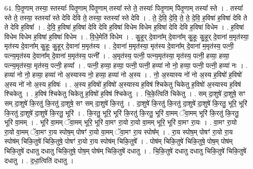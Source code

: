 \documentclass[17pt]{extarticle}
\begin{document}
64. पि॒तृ॒णाम् तस्या॒ स्तस्याः᳚ पितृ॒णाम् पि॑तृ॒णाम् तस्या᳚ स्ते ते॒ तस्याः᳚ पितृ॒णाम् पि॑तृ॒णाम् तस्या᳚ स्ते । . तस्या᳚ स्ते ते॒ तस्या॒ स्तस्या᳚ स्ते देवि देवि ते॒ तस्या॒ स्तस्या᳚ स्ते देवि । . ते॒ दे॒वि॒ दे॒वि॒ ते॒ ते॒ दे॒वि॒ ह॒विषा॑ ह॒विषा॑ देवि ते ते देवि ह॒विषा᳚ । . दे॒वि॒ ह॒विषा॑ ह॒विषा॑ देवि देवि ह॒विषा॑ विधेम विधेम ह॒विषा॑ देवि देवि ह॒विषा॑ विधेम । . ह॒विषा॑ विधेम विधेम ह॒विषा॑ ह॒विषा॑ विधेम । . वि॒धे॒मेति॑ विधेम । . कु॒हूर् दे॒वाना᳚म् दे॒वाना᳚म् कु॒हूः कु॒हूर् दे॒वाना॑ म॒मृत॑स्या॒ मृत॑स्य दे॒वाना᳚म् कु॒हूः कु॒हूर् दे॒वाना॑ म॒मृत॑स्य । . दे॒वाना॑ म॒मृत॑स्या॒ मृत॑स्य दे॒वाना᳚म् दे॒वाना॑ म॒मृत॑स्य॒ पत्नी॒ पत्न्य॒मृत॑स्य दे॒वाना᳚म् दे॒वाना॑ म॒मृत॑स्य॒ पत्नी᳚ । . अ॒मृत॑स्य॒ पत्नी॒ पत्न्य॒मृत॑स्या॒ मृत॑स्य॒ पत्नी॒ हव्या॒ हव्या॒ पत्न्य॒मृत॑स्या॒ मृत॑स्य॒ पत्नी॒ हव्या᳚ । . पत्नी॒ हव्या॒ हव्या॒ पत्नी॒ पत्नी॒ हव्या॑ नो नो॒ हव्या॒ पत्नी॒ पत्नी॒ हव्या॑ नः । . हव्या॑ नो नो॒ हव्या॒ हव्या॑ नो अ॒स्यास्य नो॒ हव्या॒ हव्या॑ नो अ॒स्य । . नो॒ अ॒स्यास्य नो॑ नो अ॒स्य ह॒विषो॑ ह॒विषो॑ अ॒स्य नो॑ नो अ॒स्य ह॒विषः॑ । . अ॒स्य ह॒विषो॑ ह॒विषो॑ अ॒स्यास्य ह॒विष॑ श्चिकेतु चिकेतु ह॒विषो॑ अ॒स्यास्य ह॒विष॑ श्चिकेतु । . ह॒विष॑ श्चिकेतु चिकेतु ह॒विषो॑ ह॒विष॑ श्चिकेतु । . चि॒के॒त्विति॑ चिकेतु । . सम् दा॒शुषे॑ दा॒शुषे॒ सꣳ सम् दा॒शुषे॑ कि॒रतु॑ कि॒रतु॑ दा॒शुषे॒ सꣳ सम् दा॒शुषे॑ कि॒रतु॑ । . दा॒शुषे॑ कि॒रतु॑ कि॒रतु॑ दा॒शुषे॑ दा॒शुषे॑ कि॒रतु॒ भूरि॒ भूरि॑ कि॒रतु॑ दा॒शुषे॑ दा॒शुषे॑ कि॒रतु॒ भूरि॑ । . कि॒रतु॒ भूरि॒ भूरि॑ कि॒रतु॑ कि॒रतु॒ भूरि॑ वा॒मम् ॅवा॒मम् भूरि॑ कि॒रतु॑ कि॒रतु॒ भूरि॑ वा॒मम् । . भूरि॑ वा॒मम् ॅवा॒मम् भूरि॒ भूरि॑ वा॒मꣳ रा॒यो रा॒यो वा॒मम् भूरि॒ भूरि॑ वा॒मꣳ रा॒यः । . वा॒मꣳ रा॒यो रा॒यो वा॒मम् ॅवा॒मꣳ रा॒य स्पोष॒म् पोषꣳ॑ रा॒यो वा॒मम् ॅवा॒मꣳ रा॒य स्पोष᳚म् । . रा॒य स्पोष॒म् पोषꣳ॑ रा॒यो रा॒य स्पोष॑म् चिकि॒तुषे॑ चिकि॒तुषे॒ पोषꣳ॑ रा॒यो रा॒य स्पोष॑म् चिकि॒तुषे᳚ । . पोष॑म् चिकि॒तुषे॑ चिकि॒तुषे॒ पोष॒म् पोष॑म् चिकि॒तुषे॑ दधातु दधातु चिकि॒तुषे॒ पोष॒म् पोष॑म् चिकि॒तुषे॑ दधातु । . चि॒कि॒तुषे॑ दधातु दधातु चिकि॒तुषे॑ चिकि॒तुषे॑ दधातु । . द॒धा॒त्विति॑ दधातु । \newline
\pagebreak
\end{document}
